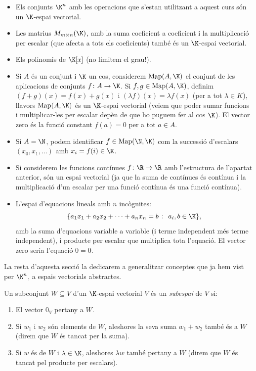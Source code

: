 \begin{exemple}
    \begin{itemize}
        \item Els conjunts $\K^n$ amb les operacions que s'estan utilitzant a aquest curs són un $\K$-espai vectorial.
        \item Les matrius $M_{m\times n}(\K)$, amb la suma coeficient a coeficient i la multiplicació per escalar (que afecta a tots els coeficients) també és un $\K$-espai vectorial. 
        \item Els polinomis de $\K[x]$ (no limitem el grau!).
        \item Si $A$ és un conjunt i $\K$ un cos, considerem $\Map(A,\K)$ el conjunt de les aplicacions de conjunts $f\colon A \to \K$. Si $f,g\in\Map(A,\K)$, definim $(f+g)(x)=f(x)+g(x)$ i $(\lambda f)(x)=\lambda f(x)$ (per a tot $\lambda \in K$), llavors $\Map(A,\K)$ és un $\K$-espai vectorial (veiem que poder sumar funcions i multiplicar-les per escalar depèn de que ho puguem fer al cos $\K$). El vector zero és la funció constant $f(a)=0$ per a tot $a\in A$.
        \item Si $A=\N$, podem identificar $f\in \Map(\N,\K)$ com la successió d'escalars $(x_0,x_1,\dots)$ amb $x_i=f(i)\in \K$. 
        \item Si considerem les funcions contínues $f\colon \R \to \R$ amb l'estructura de l'apartat anterior, són un espai vectorial (ja que la suma de contínues és contínua i la multiplicació d'un escalar per una funció contínua és una funció contínua).
        \item L'espai d'equacions lineals amb $n$ incògnites:
        $$
        \{a_1x_1+a_2x_2+\cdots+a_nx_n=b ~\colon~ a_i, b \in\K\},
        $$
        amb la suma d'equacions variable a variable (i terme independent més terme independent), i producte per escalar que multiplica tota l'equació. El vector zero seria l'equació $0=0$.
    \end{itemize}
\end{exemple}

La resta d'aquesta secció la dedicarem a generalitzar conceptes que ja hem vist per $\K^n$, a espais vectorials abstractes.

\begin{definicio}
    Un subconjunt $W\subseteq V$ d'un $\K$-espai vectorial $V$ és un \emph{subespai} de $V$ si:
    \begin{enumerate}
        \item El vector $0_V$ pertany a $W$.
        \item Si $w_1$ i $w_2$ són elements de $W$, aleshores la seva suma $w_1+w_2$ també és a $W$ (direm que $W$ és tancat per la suma).
        \item Si $w$ és de $W$ i $\lambda \in\K$, aleshores $\lambda w$ també pertany a $W$ (direm que $W$ és tancat pel producte per escalars).
    \end{enumerate}
\end{definicio}

